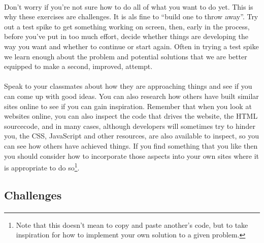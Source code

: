 \documentclass[10pt, a4paper, twosize]{article}
\begin{document}
\paragraph{} Don't worry if you're not sure how to do all of what you want to do yet. This is why these exercises are challenges. It is als fine to ``build one to throw away''. Try out a test spike to get something working on screen, then, early in the process, before you've put in too much effort, decide whether things are developing the way you want and whether to continue or start again. Often in trying a test spike we learn enough about the problem and potential solutions that we are better equipped to make a second, improved, attempt.

\paragraph{} Speak to your classmates about how they are approaching things and see if you can come up with good ideas. You can also research how others have built similar sites online to see if you can gain inspiration. Remember that when you look at websites online, you can also inspect the code that drives the website, the HTML sourcecode, and in many cases, although developers will sometimes try to hinder you, the CSS, JavaScript and other resources, are also available to inspect, so you can see how others have achieved things. If you find something that you like then you should consider how to incorporate those aspects into your own sites where it is appropriate to do so\footnote{Note that this doesn't mean to copy and paste another's code, but to take inspiration for how to implement your own solution to a given problem.}.

\subsection{Challenges}
\paragraph{}
\end{document}
